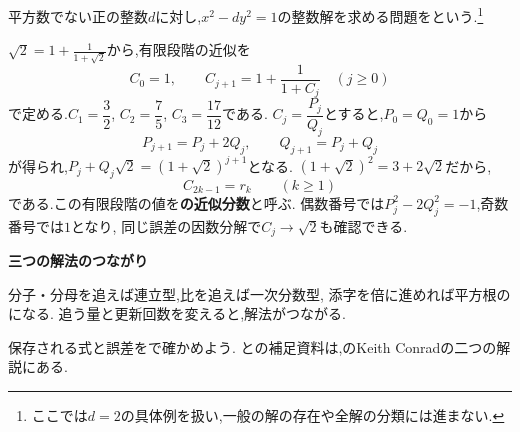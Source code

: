   平方数でない正の整数$d$に対し,$x^2-dy^2=1$の整数解を求める問題を\textbf{}という.\footnote{ここでは$d=2$の具体例を扱い,一般の解の存在や全解の分類には進まない.}

  $\sqrt2=1+\frac1{1+\sqrt2}$から,有限段階の近似を
  \[
    C_0=1,\qquad C_{j+1}=1+\frac1{1+C_j}
    \quad(j\ge0)
  \]
  で定める.$C_1=\dfrac{3}{2}$, $C_2=\dfrac{7}{5}$, $C_3=\dfrac{17}{12}$である.
  $C_j=\dfrac{P_j}{Q_j}$とすると,$P_0=Q_0=1$から
  \[
    P_{j+1}=P_j+2Q_j,\qquad Q_{j+1}=P_j+Q_j
  \]
  が得られ,$P_j+Q_j\sqrt2=(1+\sqrt2)^{j+1}$となる.
  $(1+\sqrt2)^2=3+2\sqrt2$だから,
  \[
    C_{2k-1}=r_k\qquad(k\ge1)
  \]
  である.この有限段階の値を\textbf{の近似分数}と呼ぶ.
  偶数番号では$P_j^2-2Q_j^2=-1$,奇数番号では$1$となり,
  同じ誤差の因数分解で$C_j\to\sqrt2$も確認できる.

  \begin{bookpoint}
    \textbf{三つの解法のつながり}\par
    分子・分母を追えば連立型,比を追えば一次分数型,
    添字を倍に進めれば平方根のになる.
    追う量と更新回数を変えると,解法がつながる.
  \end{bookpoint}
  保存される式と誤差をで確かめよう.
  との補足資料は,のKeith Conradの二つの解説にある.
